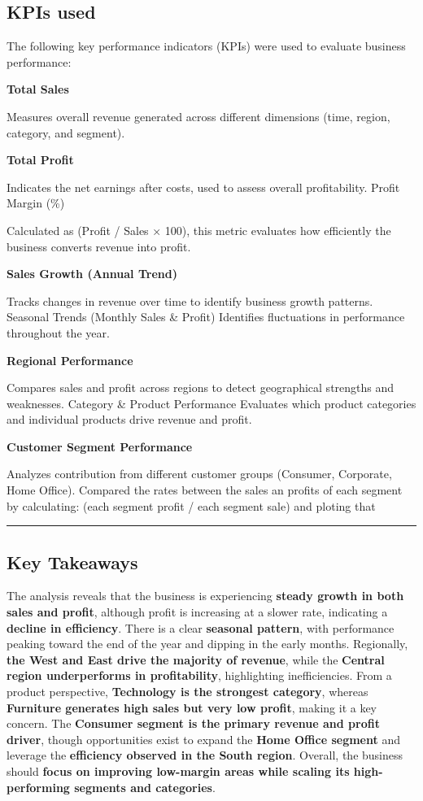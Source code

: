 \documentclass[
  letterpaper,
  DIV=11,
  numbers=noendperiod]{scrartcl}
\begin{document}
\subsection{KPIs used}\label{kpis-used}

The following key performance indicators (KPIs) were used to evaluate
business performance:

\textbf{Total Sales}

Measures overall revenue generated across different dimensions (time,
region, category, and segment).

\textbf{Total Profit}

Indicates the net earnings after costs, used to assess overall
profitability. Profit Margin (\%)

Calculated as (Profit / Sales × 100), this metric evaluates how
efficiently the business converts revenue into profit.

\textbf{Sales Growth (Annual Trend)}

Tracks changes in revenue over time to identify business growth
patterns. Seasonal Trends (Monthly Sales \& Profit) Identifies
fluctuations in performance throughout the year.

\textbf{Regional Performance}

Compares sales and profit across regions to detect geographical
strengths and weaknesses. Category \& Product Performance Evaluates
which product categories and individual products drive revenue and
profit.

\textbf{Customer Segment Performance}

Analyzes contribution from different customer groups (Consumer,
Corporate, Home Office). Compared the rates between the sales an profits
of each segment by calculating: (each segment profit / each segment
sale) and ploting that

\begin{center}\rule{0.5\linewidth}{0.5pt}\end{center}

\subsection{\texorpdfstring{\textbf{Key
Takeaways}}{Key Takeaways}}\label{key-takeaways}

The analysis reveals that the business is experiencing \textbf{steady
growth in both sales and profit}, although profit is increasing at a
slower rate, indicating a \textbf{decline in efficiency}. There is a
clear \textbf{seasonal pattern}, with performance peaking toward the end
of the year and dipping in the early months. Regionally, \textbf{the
West and East drive the majority of revenue}, while the \textbf{Central
region underperforms in profitability}, highlighting inefficiencies.
From a product perspective, \textbf{Technology is the strongest
category}, whereas \textbf{Furniture generates high sales but very low
profit}, making it a key concern. The \textbf{Consumer segment is the
primary revenue and profit driver}, though opportunities exist to expand
the \textbf{Home Office segment} and leverage the \textbf{efficiency
observed in the South region}. Overall, the business should
\textbf{focus on improving low-margin areas while scaling its
high-performing segments and categories}.
\end{document}
